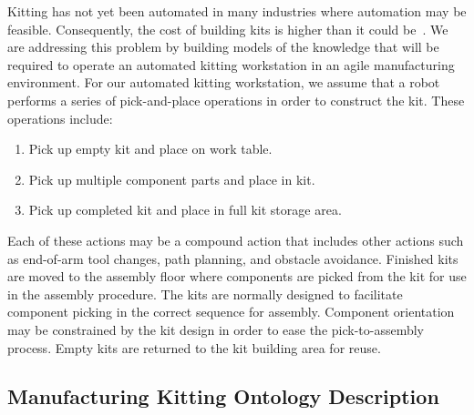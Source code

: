 \documentclass[preprint,12pt]{elsarticle}
\begin{document}
Kitting has not yet been automated in many industries where automation may be feasible. Consequently, the cost of building kits is higher than it could be~\cite{Balakirsky.IROS.2012}. We are addressing this problem by building models of the knowledge that will be required to operate an automated kitting workstation in an agile manufacturing environment. For our automated kitting workstation, we assume that a robot performs a series of pick-and-place operations in order to construct the kit. These operations include:
\begin{enumerate}
\item Pick up empty kit and place on work table.
\item Pick up multiple component parts and place in kit.
\item Pick up completed kit and place in full kit storage area.
\end{enumerate}

Each of these actions may be a compound action that includes other actions such as end-of-arm tool changes, path planning, and obstacle avoidance. Finished kits are moved to the assembly floor where components are picked from the kit for use in the assembly procedure. The kits are normally designed to facilitate component picking in the correct sequence for assembly. Component orientation may be constrained by the kit design in order to ease the pick-to-assembly process. Empty kits are returned to the kit building area for reuse.


\subsection{Manufacturing Kitting Ontology Description}
\end{document}
